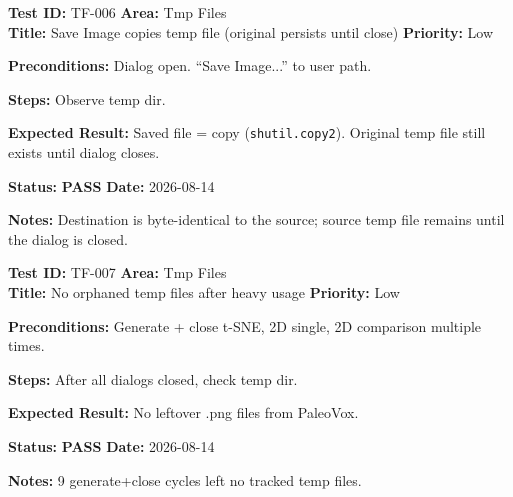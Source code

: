 \documentclass[12pt,a4paper]{article}
\newcommand{\pass}{\textcolor{paleogreen}{\textbf{PASS}}}
\newcommand{\testheader}[4]{%
  \smallskip
  \noindent\textbf{Test ID:} #1 \hfill \textbf{Area:} #2 \\
  \textbf{Title:} #3 \hfill \textbf{Priority:} #4
}
\newenvironment{testbody}{%
  \begin{description}[leftmargin=2em,style=nextline]
}{%
  \end{description}
  \smallskip
}
\begin{document}
\testheader{TF-006}{Tmp Files}{Save Image copies temp file (original persists until close)}{Low}
\begin{testbody}
  \item[\textbf{Preconditions:}] Dialog open. ``Save Image...'' to user path.
  \item[\textbf{Steps:}] Observe temp dir.
  \item[\textbf{Expected Result:}] Saved file = copy (\texttt{shutil.copy2}).
        Original temp file still exists until dialog closes.
  \item[\textbf{Status:}] \pass{} \hspace{1em} \textbf{Date:} 2026-08-14
  \item[\textbf{Notes:}] Destination is byte-identical to the source; source
        temp file remains until the dialog is closed.
\end{testbody}

\testheader{TF-007}{Tmp Files}{No orphaned temp files after heavy usage}{Low}
\begin{testbody}
  \item[\textbf{Preconditions:}] Generate + close t-SNE, 2D single, 2D
        comparison multiple times.
  \item[\textbf{Steps:}] After all dialogs closed, check temp dir.
  \item[\textbf{Expected Result:}] No leftover .png files from PaleoVox.
  \item[\textbf{Status:}] \pass{} \hspace{1em} \textbf{Date:} 2026-08-14
  \item[\textbf{Notes:}] 9 generate+close cycles left no tracked temp files.
\end{testbody}
\end{document}
